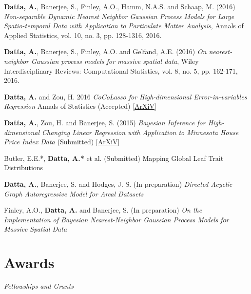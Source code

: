 \documentclass[11pt,a4paper,sans]{moderncv} %
\begin{document}
{\vskip 4mm \textbf{Datta, A.}, Banerjee, S., Finley, A.O., Hamm, N.A.S. and Schaap, M. (2016) {\em Non-separable Dynamic Nearest Neighbor Gaussian Process Models for Large Spatio-temporal Data with Application to Particulate Matter Analysis}, Annals of Applied Statistics, vol. 10, no. 3, pp. 128-1316, 2016.

\vskip 4mm \textbf {Datta, A.}, Banerjee, S., Finley, A.O. and Gelfand, A.E. (2016) {\em On nearest-neighbor Gaussian process models for massive spatial data}, Wiley Interdisciplinary Reviews: Computational Statistics, vol. 8, no. 5, pp. 162-171, 2016.

\vskip 4mm \textbf{Datta, A.} and Zou, H. 2016 {\em CoCoLasso for High-dimensional Error-in-variables Regression} Annals of Statistics (Accepted) \href{https://arxiv.org/pdf/1510.07123v2.pdf}{[ArXiV]}

\vskip 4mm \textbf{Datta, A.}, Zou, H. and Banerjee, S. (2015) {\em Bayesian Inference for High-dimensional Changing Linear Regression with Application to Minnesota House Price Index Data} (Submitted) \href{https://arxiv.org/pdf/1510.07129.pdf}{[ArXiV]}

\vskip 2mm Butler, E.E.*, \textbf {Datta, A.*} et al. (Submitted) {\em }Mapping Global Leaf Trait Distributions}

\vskip 4mm \textbf{Datta, A.}, Banerjee, S. and Hodges, J. S. (In preparation) {\em Directed Acyclic Graph Autoregressive Model for Areal Datasets}

\vskip 4mm Finley, A.O., \textbf{Datta, A.} and Banerjee, S. (In preparation) {\em On the Implementation of Bayesian Nearest-Neighbor Gaussian Process Models for Massive Spatial Data}


 \section{Awards}
{\em Fellowships and Grants \vskip 2mm}

 {%
}

\end{document}
